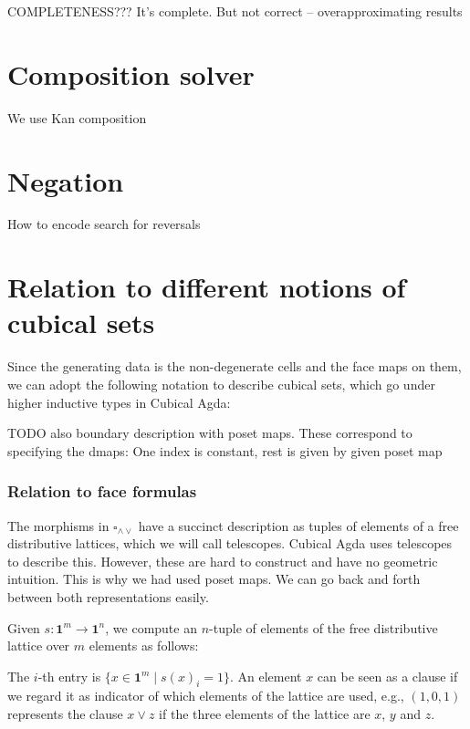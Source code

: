 \documentclass[11pt]{article}
\theoremstyle{definition}
\newcommand{\join}{\wedge}
\newcommand{\meet}{\vee}
\newcommand{\dedekind}{\square_{\join \meet}}
\newcommand{\pint}[1]{\mathbf{1}^{#1}}
\begin{document}
COMPLETENESS???
It's complete. But not correct -- overapproximating results





\section{Composition solver}

We use Kan composition



\section{Negation}

How to encode search for reversals


\section{Relation to different notions of cubical sets}

Since the generating data is the non-degenerate cells and the face maps on them,
we can adopt the following notation to describe cubical sets, which go under
higher inductive types in Cubical Agda:

TODO also boundary description with poset maps. These correspond to specifying
the dmaps: One index is constant, rest is given by given poset map


\subsubsection{Relation to face formulas}

The morphisms in $\dedekind$ have a succinct description as tuples of elements of a free
distributive lattices, which we will call telescopes.
Cubical Agda uses telescopes to describe this. However, these are hard to
construct and have no geometric intuition. This is why we had used poset maps.
We can go back and forth between both representations easily.


Given $s : \pint{m} \to \pint{n}$, we compute an $n$-tuple of elements of the
free distributive lattice over $m$ elements as follows:

The $i$-th entry is $\{ x \in \pint{m} \mid s(x)_i = 1 \}$. An element $x$ can be
seen as a clause if we regard it as indicator of which elements of the lattice
are used, e.g., $(1,0,1)$ represents the clause $x \meet z$ if the three
elements of the lattice are $x$, $y$ and $z$.
\end{document}
